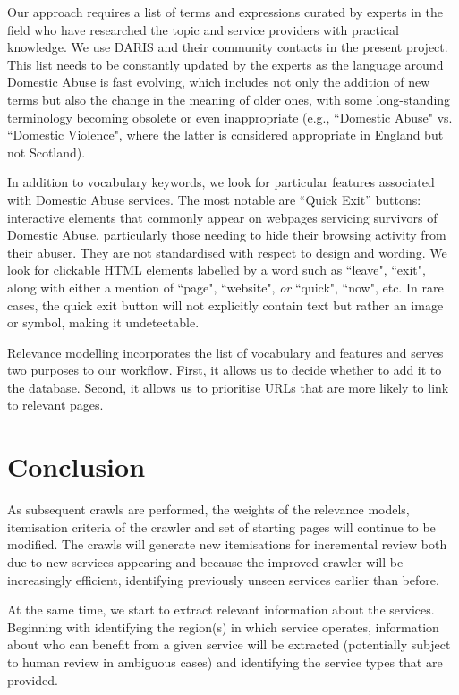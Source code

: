\documentclass[conference]{IEEEtran}
\begin{document}
Our approach requires a list of terms and expressions curated by experts in the field who have researched the topic and service providers with practical knowledge. 
We use DARIS and their community contacts in the present project\cite{theme}. 
This list needs to be constantly updated by the experts as the language around Domestic Abuse is fast evolving, which includes not only the addition of new terms but also the change in the meaning of older ones, with some long-standing terminology becoming obsolete or even inappropriate (e.g., ``Domestic Abuse" vs. ``Domestic Violence", where the latter is considered appropriate in England but not Scotland).


In addition to vocabulary keywords, we look for particular features associated with Domestic Abuse services. 
The most notable are ``Quick Exit'' buttons: interactive elements that commonly appear on webpages servicing survivors of Domestic Abuse, particularly those needing to hide their browsing activity from their abuser. 
They are not standardised with respect to design and wording.
We look for clickable HTML elements labelled by a word such as ``leave", ``exit", along with either a mention of ``page", ``website", \textit{or} ``quick", ``now", etc. 
In rare cases, the quick exit button will not explicitly contain text but rather an image or symbol, making it undetectable. 

Relevance modelling incorporates the list of vocabulary and features and serves two purposes to our workflow. First, it allows us to decide whether to add it to the database. Second, it allows us to prioritise URLs that are more likely to link to relevant pages.



\section{Conclusion}
\label{sec:future}

As subsequent crawls are performed, the weights of the relevance models, itemisation criteria of the crawler and set of starting pages will continue to be modified. The crawls will generate new itemisations for incremental review both due to new services appearing and because the improved crawler will be increasingly efficient, identifying previously unseen services earlier than before.

At the same time, we start to extract relevant information about the services.
Beginning with identifying the region(s) in which service operates, information about who can benefit from a given service will be extracted (potentially subject to human review in ambiguous cases) and identifying the service types that are provided.
\end{document}
